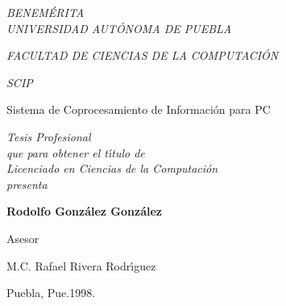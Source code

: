 \begin{titlepage}
\begin{center}

{\Large{\it BENEM\'ERITA\\UNIVERSIDAD AUT\'ONOMA DE PUEBLA}}

\vspace*{5mm}

{\Large{\it FACULTAD DE CIENCIAS DE LA COMPUTACI\'ON}}

\vspace*{20mm}

{\LARGE{\it SCIP}}

\vspace*{5mm}

{\LARGE Sistema de Coprocesamiento de Informaci\'on para PC}

\vspace*{20mm}

{\large{\it Tesis Profesional\\
que para obtener el t\'{\i}tulo de\\
Licenciado en Ciencias de la Computaci\'on\\
presenta}}
             
\vspace*{5mm}             
             
{\Large {\bf Rodolfo Gonz\'alez Gonz\'alez}}

\vspace*{20mm}

{\large Asesor

M.C. Rafael Rivera Rodr\'{\i}guez}

\vspace*{20mm}

{\large Puebla, Pue.\hspace*{8cm}1998.}

\end{center}
\end{titlepage}

